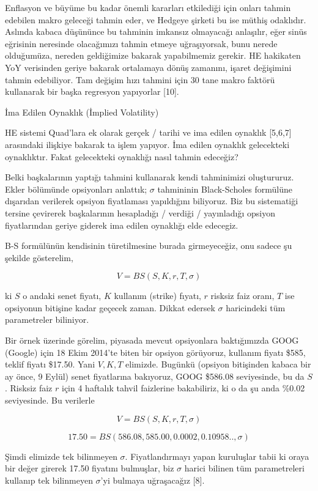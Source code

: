 \documentclass[12pt,fleqn]{article}\usepackage{../../common}
\begin{document}
Enflasyon ve büyüme bu kadar önemli kararları etkilediği için onları tahmin
edebilen makro geleceği tahmin eder, ve Hedgeye şirketi bu ise müthiş
odaklıdır. Aslında kabaca düşününce bu tahminin imkansız olmayacağı anlaşılır,
eğer sinüs eğrisinin neresinde olacağımızı tahmin etmeye uğraşıyorsak, bunu
nerede olduğumüza, nereden geldiğimize bakarak yapabilmemiz gerekir. HE
hakikaten YoY verisinden geriye bakarak ortalamaya dönüş zamanını, işaret
değişimini tahmin edebiliyor. Tam değişim hızı tahmini için 30 tane makro
faktörü kullanarak bir başka regresyon yapıyorlar [10].

İma Edilen Oynaklık (İmplied Volatility)

HE sistemi Quad'lara ek olarak gerçek / tarihi ve ima edilen oynaklık [5,6,7]
arasındaki ilişkiye bakarak ta işlem yapıyor. İma edilen oynaklık gelecekteki
oynaklıktır. Fakat gelecekteki oynaklığı nasıl tahmin edeceğiz?

Belki başkalarının yaptığı tahmini kullanarak kendi tahminimizi
oluştururuz. Ekler bölümünde opsiyonları anlattık; $\sigma$ tahmininin
Black-Scholes formülüne dışarıdan verilerek opsiyon fiyatlaması yapıldığını
biliyoruz. Biz bu sistematiği tersine çevirerek başkalarının hesapladığı /
verdiği / yayınladığı opsiyon fiyatlarından geriye giderek ima edilen oynaklığı
elde edecegiz.

B-S formülünün kendisinin türetilmesine burada girmeyeceğiz, onu sadece şu
şekilde gösterelim,

$$
V = BS(S,K,r,T,\sigma)
$$

ki $S$ o andaki senet fiyatı, $K$ kullanım (strike) fıyatı, $r$ risksiz faiz
oranı, $T$ ise opsiyonun bitişine kadar geçecek zaman. Dikkat edersek $\sigma$
haricindeki tüm parametreler biliniyor.

Bir örnek üzerinde görelim, piyasada mevcut opsiyonlara baktığımızda GOOG
(Google) için 18 Ekim 2014'te biten bir opsiyon görüyoruz, kullanım fiyatı
\$585, teklif fiyatı \$17.50. Yani $V,K,T$ elimizde. Bugünkü (opsiyon bitişinden
kabaca bir ay önce, 9 Eylül) senet fiyatlarına bakıyoruz, GOOG \$586.08
seviyesinde, bu da $S$. Risksiz faiz $r$ için 4 haftalık tahvil faizlerine
bakabiliriz, ki o da şu anda \%0.02 seviyesinde. Bu verilerle

$$ V = BS(S,K,r,T,\sigma) $$

$$ 17.50 = BS(586.08, 585.00, 0.0002, 0.10958.., \sigma)$$

Şimdi elimizde tek bilinmeyen $\sigma$. Fiyatlandırmayı yapan kuruluşlar tabii
ki oraya bir değer girerek 17.50 fiyatını bulmuşlar, biz $\sigma$ harici bilinen
tüm parametreleri kullanıp tek bilinmeyen $\sigma$'yi bulmaya uğraşacağız [8].
\end{document}
